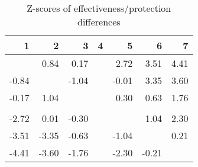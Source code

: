 \begin{table}[ht]
\centering
\begin{tabular}{rrrrrrr}
  \hline
1 & 2 & 3 & 4 & 5 & 6 & 7 \\ 
  \hline
 & 0.84 & 0.17 &  & 2.72 & 3.51 & 4.41 \\ 
  -0.84 &  & -1.04 &  & -0.01 & 3.35 & 3.60 \\ 
  -0.17 & 1.04 &  &  & 0.30 & 0.63 & 1.76 \\ 
   &  &  &  &  &  &  \\ 
  -2.72 & 0.01 & -0.30 &  &  & 1.04 & 2.30 \\ 
  -3.51 & -3.35 & -0.63 &  & -1.04 &  & 0.21 \\ 
  -4.41 & -3.60 & -1.76 &  & -2.30 & -0.21 &  \\ 
   \hline
\end{tabular}
\caption{Z-scores of effectiveness/protection differences} 
\end{table}
